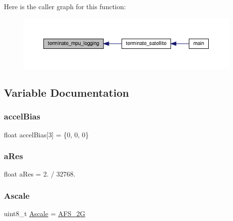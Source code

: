 Here is the caller graph for this function\+:\nopagebreak
\begin{figure}[H]
\begin{center}
\leavevmode
\includegraphics[width=350pt]{i2c-interface_8c_a3644aefb56a2169f316b0f2510ffc56c_icgraph}
\end{center}
\end{figure}


\subsection{Variable Documentation}
\mbox{\label{i2c-interface_8c_ad9b8523cb349f7bbd3fa2ffa9c2c9d4b}} 
\subsubsection{\texorpdfstring{accel\+Bias}{accelBias}}
{\footnotesize\ttfamily float accel\+Bias\mbox{[}3\mbox{]} = \{0, 0, 0\}}

\mbox{\label{i2c-interface_8c_a00dcba4fbbc703a15404c051f397721f}} 
\subsubsection{\texorpdfstring{a\+Res}{aRes}}
{\footnotesize\ttfamily float a\+Res = 2. / 32768.}

\mbox{\label{i2c-interface_8c_a1b3bba16cabe134bc640926508ec94d3}} 
\subsubsection{\texorpdfstring{Ascale}{Ascale}}
{\footnotesize\ttfamily uint8\+\_\+t \hyperlink{i2c-interface_8c_a809d38a83bb0293b913cb890cafd82a8}{Ascale} = \hyperlink{i2c-interface_8c_a809d38a83bb0293b913cb890cafd82a8a93154da7a495cfb3b9ab29d2d5d4891b}{A\+F\+S\+\_\+2G}}


